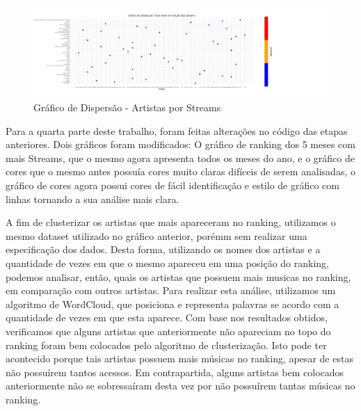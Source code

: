 \documentclass[11pt]{article}
\makeatletter
\def\maxwidth{\ifdim\Gin@nat@width>\linewidth\linewidth
    \else\Gin@nat@width\fi}
\let\Oldincludegraphics\includegraphics
\renewcommand{\includegraphics}[1]{\Oldincludegraphics[width=.8\maxwidth]{#1}}
\makeatother
\begin{document}
\begin{figure}
\centering
\includegraphics{ArtistasPorStreamsCores.png}
\caption{Gráfico de Dispersão - Artistas por Streams}
\end{figure}

    Para a quarta parte deste trabalho, foram feitas alterações no código
das etapas anteriores. Dois gráficos foram modificados: O gráfico de
ranking dos 5 meses com mais Streams, que o mesmo agora apresenta todos
os meses do ano, e o gráfico de cores que o mesmo antes possuía cores
muito claras difíceis de serem analisadas, o gráfico de cores agora
possui cores de fácil identificação e estilo de gráfico com linhas
tornando a sua análise mais clara.

    A fim de clusterizar os artistas que mais apareceram no ranking,
utilizamos o mesmo dataset utilizado no gráfico anterior, porémm sem
realizar uma especificação dos dados. Desta forma, utilizando os nomes
dos artistas e a quantidade de vezes em que o mesmo apareceu em uma
posição do ranking, podemos analisar, então, quais os artistas que
possuem mais musicas no ranking, em comparação com outros artistas. Para
realizar esta análise, utilizamos um algoritmo de WordCloud, que
posiciona e representa palavras se acordo com a quantidade de vezes em
que esta aparece. Com base nos resultados obtidos, verificamos que
alguns artistas que anteriormente não apareciam no topo do ranking foram
bem colocados pelo algoritmo de clusterização. Isto pode ter acontecido
porque tais artistas possuem mais músicas no ranking, apesar de estas
não possuírem tantos acessos. Em contrapartida, alguns artistas bem
colocados anteriormente não se sobressaíram desta vez por não possuírem
tantas músicas no ranking.
\end{document}
